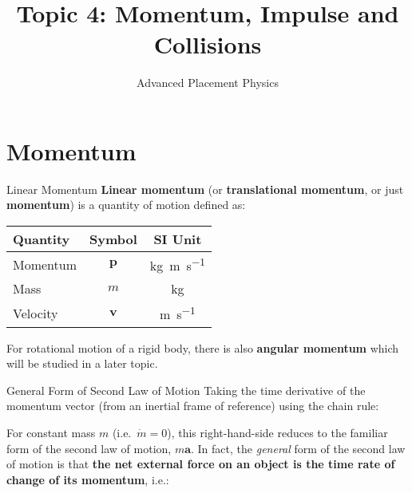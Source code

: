 \documentclass[12pt,compress,aspectratio=169]{beamer}
\title{Topic 4: Momentum, Impulse and Collisions}
\subtitle{Advanced Placement Physics}
\begin{document}
\begin{frame}
  \maketitle
\end{frame}

\section{Momentum}


\begin{frame}{Linear Momentum}
  \textbf{Linear momentum} (or \textbf{translational momentum}, or just
  \textbf{momentum}) is a quantity of motion defined as:

  \begin{center}
    \begin{tabular}{l|c|c}
      \rowcolor{pink}
      \textbf{Quantity} & \textbf{Symbol} & \textbf{SI Unit} \\ \hline
      Momentum & $\bm{p}$ & \si{\kilo\gram.\metre\per\second} \\
      Mass      & $m$    & \si{\kilo\gram} \\
      Velocity  & $\bm{v}$ & \si{\metre\per\second}
    \end{tabular}
  \end{center}
  For rotational motion of a rigid body, there is also \textbf{angular momentum}
  which will be studied in a later topic.
\end{frame}



\begin{frame}{General Form of Second Law of Motion}
  Taking the time derivative of the momentum vector (from an inertial frame of
  reference) using the chain rule:


  For constant mass $m$ (i.e.\ $\dot{m}=0$), this right-hand-side reduces to the
  familiar form of the second law of motion, $m\bm{a}$. In fact, the
  \emph{general} form of the second law of motion is that \textbf{the net
    external force on an object is the time rate of change of its momentum},
  i.e.:

\end{frame}
\end{document}
